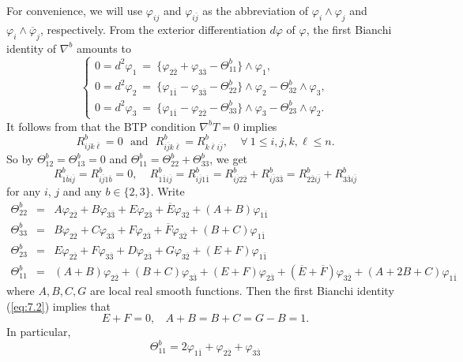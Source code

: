 \documentclass{amsart}
\numberwithin{equation}{section}
\theoremstyle{definition}
\renewcommand{\1}{\mathds{1}}
\renewcommand{\>}{\rightarrow}
\begin{document}
For convenience, we will use $\varphi_{ij}$ and $\varphi_{i\bar{j}}$ as the abbreviation of $\varphi_i \wedge \varphi_j$ and $\varphi_i \wedge \overline{\varphi}_j$, respectively. From the exterior differentiation $d\varphi$ of $\varphi$, the first Bianchi identity of $\nabla^b$ amounts to
\begin{equation} \label{eq:7.2}
\left\{ \begin{array}{lll} 0 =  d^2\varphi_1 \ = \ \{ \varphi_{2\overline{2}} + \varphi_{3\overline{3}} - \Theta^b_{11} \} \wedge \varphi_1, \\
0 = d^2\varphi_2 \ = \ \{  \varphi_{1\overline{1}} -  \varphi_{3\overline{3}} - \Theta^b_{22} \} \wedge \varphi_2 - \Theta^b_{32}\wedge \varphi_3, \\
0 = d^2\varphi_3 \ = \ \{  \varphi_{1\overline{1}} -  \varphi_{2\overline{2}} - \Theta^b_{33} \} \wedge \varphi_3 - \Theta^b_{23}\wedge \varphi_2.
\end{array} \right.
\end{equation}
It follows from \cite[Theorem 1.1]{ZhaoZ24} that the BTP condition $\nabla^bT=0$ implies
$$ R^b_{ijk\overline{\ell}} =0 \ \ \ \mbox{and} \ \ \  R^b_{i\overline{j}k\overline{\ell}} = R^b_{k\overline{\ell}i\overline{j}}, \ \ \ \ \ \forall \ 1 \leq i,j,k,\ell \leq n. $$
So by $\Theta^b_{12}=\Theta^b_{13}=0$ and $\Theta^b_{11}= \Theta^b_{22} + \Theta^b_{33}$, we get
$$ R^b_{1\overline{b}i \overline{j}} = R^b_{i \overline{j}1\overline{b}}=0, \ \ \ \ \ R^b_{1 \overline{1}i\overline{j}} = R^b_{i\overline{j}1 \overline{1}} = R^b_{i\overline{j}2 \overline{2}} + R^b_{i\overline{j}3 \overline{3}}
= R^b_{2 \overline{2}i\overline{j}} + R^b_{3 \overline{3}i\overline{j}} $$
for any $i$, $j$ and any $b\in \{ 2,3\}$. Write
\begin{eqnarray*}
\Theta^b_{22} & = & A \varphi_{2\overline{2}} + B \varphi_{3\overline{3}} + E \varphi_{2\overline{3}} + \overline{E} \varphi_{3\overline{2}} + (A+B) \varphi_{1\overline{1}} \\
\Theta^b_{33} & = & B \varphi_{2\overline{2}} + C \varphi_{3\overline{3}} + F \varphi_{2\overline{3}} + \overline{F} \varphi_{3\overline{2}} + (B+C) \varphi_{1\overline{1}} \\
\Theta^b_{23} & = & E \varphi_{2\overline{2}} + F \varphi_{3\overline{3}} + D \varphi_{2\overline{3}} + G \varphi_{3\overline{2}} + (E+F) \varphi_{1\overline{1}} \\
\Theta^b_{11} & = & (A+B) \varphi_{2\overline{2}} + (B+C) \varphi_{3\overline{3}} + (E+F) \varphi_{2\overline{3}} + (\overline{E}+\overline{F}) \varphi_{3\overline{2}} + (A+2B+C) \varphi_{1\overline{1}}
\end{eqnarray*}
where $A,B,C,G$ are local real smooth functions. Then the first Bianchi identity (\ref{eq:7.2}) implies that
$$ E+F=0, \ \ \ \ A+B=B+C=G-B=1. $$
In particular,
\begin{equation}  \label{eq:7.3}
\Theta^b_{11} = 2\varphi_{1\overline{1}} + \varphi_{2\overline{2}} + \varphi_{3\overline{3}}
\end{equation}
\end{document}
